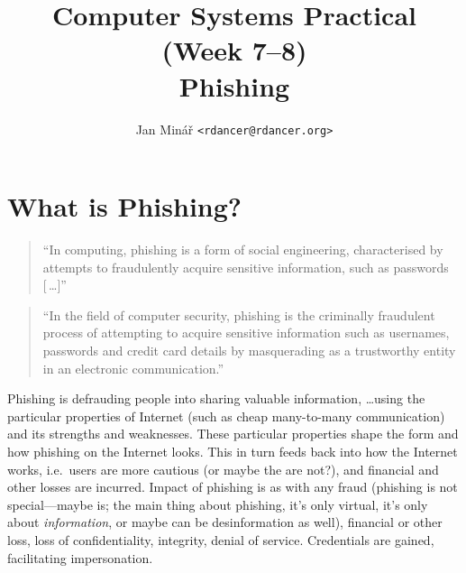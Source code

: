 \documentclass[10pt]{article}
\author{Jan Minář {\tt <rdancer@rdancer.org>}}
\title{Computer Systems Practical (Week 7--8)\\Phishing}
\begin{document}


\maketitle

%
%
%

%
%

\section{What is Phishing?}
\begin{quote}
``In computing, phishing is a form of social engineering, characterised by attempts to fraudulently acquire sensitive information, such as passwords [\,\ldots]'' \cite{gwavanation:phishing-definition}
\end{quote}

\begin{quote}
``In the field of computer security, phishing is the criminally fraudulent process of attempting to acquire sensitive information such as usernames, passwords and credit card details by masquerading as a trustworthy entity in an electronic communication.'' \cite{wikipedia:Phishing}
\end{quote}


Phishing is defrauding people into sharing valuable information, \ldots using the particular properties of Internet (such as cheap many-to-many communication) and its strengths and weaknesses.  These particular properties shape the form and how phishing on the Internet looks.  This in turn feeds back into how the Internet works, i.e.\ users are more cautious (or maybe the are not?), and financial and other losses are incurred.  Impact of phishing is as with any fraud (phishing is not special---maybe is; the main thing about phishing, it's only virtual, it's only about \textsl{information}, or maybe can be desinformation as well), financial or other loss, loss of confidentiality, integrity, denial of service.  Credentials are gained, facilitating impersonation.

%
%
\end{document}
